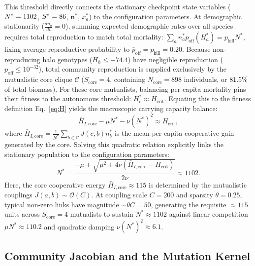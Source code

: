 \documentclass[twocolumn,amsmath,amssymb,aps,pra,10pt,floatfix,nofootinbib]{revtex4-2}
\begin{document}
This threshold directly connects the stationary checkpoint state variables ($N^* = 1102$, $S^* = 86$, $\mathbf{n}^*$, $x_a^*$) to the configuration parameters. At demographic stationarity ($\frac{dn_a}{dt} = 0$), summing expected demographic rates over all species requires total reproduction to match total mortality: $\sum_a n_a^* p_{\text{off}}(H_a^*) = p_{\text{kill}} N^*$, fixing average reproductive probability to $\bar{p}_{\text{off}} = p_{\text{kill}} = 0.20$. Because non-reproducing halo genotypes ($H_h \le -74.4$) have negligible reproduction ($p_{\text{off}} \le 10^{-32}$), total community reproduction is supplied exclusively by the mutualistic core clique $\mathcal{C}$ ($S_{\text{core}} = 4$, containing $N_{\text{core}} = 898$ individuals, or $81.5\%$ of total biomass). For these core mutualists, balancing per-capita mortality pins their fitness to the autonomous threshold: $H_c^* \approx H_{\text{crit}}$. Equating this to the fitness definition Eq.~\eqref{eq:H} yields the macroscopic carrying capacity balance:
\begin{equation}
\bar{H}_{I,\text{core}} - \mu N^* - \nu (N^*)^2 \approx H_{\text{crit}},
\label{eq:Nstar_balance}
\end{equation}
where $\bar{H}_{I,\text{core}} = \frac{1}{N^*} \sum_{b \in \mathcal{C}} J(c,b) n_b^*$ is the mean per-capita cooperative gain generated by the core. Solving this quadratic relation explicitly links the stationary population to the configuration parameters:
\begin{equation}
N^* = \frac{-\mu + \sqrt{\mu^2 + 4\nu (\bar{H}_{I,\text{core}} - H_{\text{crit}})}}{2\nu} \approx 1102.
\label{eq:Nstar_quad}
\end{equation}
Here, the core cooperative energy $\bar{H}_{I,\text{core}} \approx 115$ is determined by the mutualistic couplings $J(a,b) \sim \mathcal{O}(C)$. At coupling scale $C = 200$ and sparsity $\theta = 0.25$, typical non-zero links have magnitude $\sim \theta C = 50$, generating the requisite $\approx 115$ units across $S_{\text{core}} = 4$ mutualists to sustain $N^* \approx 1102$ against linear competition $\mu N^* \approx 110.2$ and quadratic damping $\nu (N^*)^2 \approx 6.1$.

\subsection{Community Jacobian and the Mutation Kernel}
\end{document}
